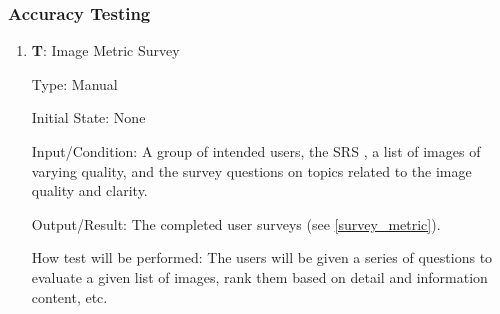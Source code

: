 \documentclass[12pt, titlepage]{article}
\newcounter{testnum} %
\begin{document}
\subsubsection{Accuracy Testing}
\begin{enumerate}

  \item{\textbf{T\thetestnum \label{T_surveyMetric}}: Image Metric Survey\\}

  Type: Manual
            
  Initial State: None
            
  Input/Condition: A group of intended users, the SRS \citep{SRS}, 
  a list of images of varying quality, and the survey questions on topics related 
  to the image quality and clarity.
            
  Output/Result: The completed user surveys (see \ref{survey_metric}).
            
  How test will be performed: The users will be given a series of questions to evaluate 
  a given list of images, rank them based on detail and information content, etc.
  
\end{enumerate}
\end{document}
